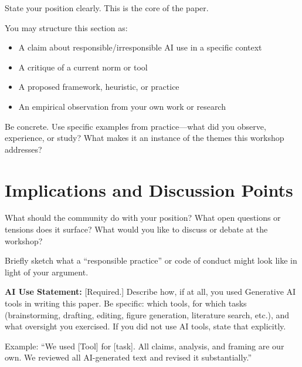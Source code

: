 \documentclass[sigconf]{acmart}
\begin{document}
State your position clearly. This is the core of the paper.

You may structure this section as:
\begin{itemize}
  \item A claim about responsible/irresponsible AI use in a specific context
  \item A critique of a current norm or tool
  \item A proposed framework, heuristic, or practice
  \item An empirical observation from your own work or research
\end{itemize}

Be concrete. Use specific examples from practice—what did you observe,
experience, or study? What makes it an instance of the themes
this workshop addresses?


\section{Implications and Discussion Points}

What should the community do with your position? What open questions
or tensions does it surface? What would you like to discuss or debate
at the workshop?

Briefly sketch what a ``responsible practice'' or code of conduct
might look like in light of your argument.


\begin{acks}
  \textbf{AI Use Statement:} [Required.] Describe how, if at all,
  you used Generative AI tools in writing this paper. Be specific:
  which tools, for which tasks (brainstorming, drafting, editing,
  figure generation, literature search, etc.), and what oversight
  you exercised. If you did not use AI tools, state that explicitly.

  Example: ``We used [Tool] for [task]. All claims, analysis, and
  framing are our own. We reviewed all AI-generated text and revised
  it substantially.''

\end{acks}



\end{document}
